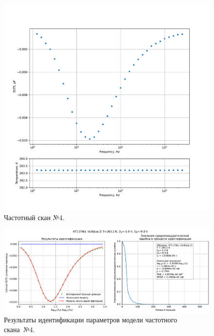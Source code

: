 \begin{figure}[!ht]
    \centering
    \includegraphics[width=1\textwidth]{../plots/КТ117№1_п1(база 2)_2500Гц-1Гц_1пФ_-10С_-1В-9В_200мВ_20мкс_шаг_0,1.pdf}
    \caption{Частотный скан №4.}
    \label{pic:frequency_scan_4}
\end{figure}

\begin{figure}[!ht]
    \centering
    \includegraphics[width=1\textwidth]{../plots/КТ117№1_п1(база 2)_2500Гц-1Гц_1пФ_-10С_-1В-9В_200мВ_20мкс_шаг_0,1_model.pdf}
    \caption{Результаты идентификации параметров модели частотного скана~№4.}
    \label{pic:frequency_scan_model4}
\end{figure}

\pagebreak


